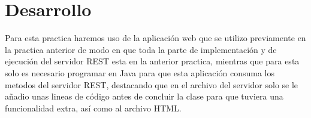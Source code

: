 \documentclass[10pt,executivepaper]{article}
\begin{document}
\begin{center}
	\par{}
\par{}
\par{}
\par\vspace{2cm}{
	Ultima fecha modificado: \today
}
\end{center}

\clearpage
\section{Desarrollo}
Para esta practica haremos uso de la aplicación web que se utilizo previamente en la practica anterior de modo en que toda la parte de implementación y de ejecución del servidor REST esta en la anterior practica, mientras que para esta solo es necesario programar en Java para que esta aplicación consuma los metodos del servidor REST, destacando que en el archivo del servidor solo se le añadio unas lineas de código antes de concluir la clase para que tuviera una funcionalidad extra, así como al archivo HTML.
\end{document}
